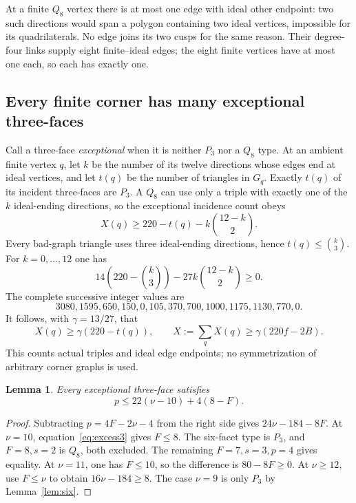 \documentclass[11pt]{article}
\newtheorem{lemma}[theorem]{Lemma}
\newcommand{\Pthree}{P_3}
\newcommand{\Qeight}{Q_8}
\begin{document}
At a finite $\Qeight$ vertex there is at most one edge with
ideal other endpoint: two such directions would span a polygon
containing two ideal vertices, impossible for its quadrilaterals.
No edge joins its two cusps for the same reason. Their degree-four
links supply eight finite--ideal edges; the eight finite vertices
have at most one each, so each has exactly one.

\subsection{Every finite corner has many exceptional three-faces}
Call a three-face \emph{exceptional} when it is neither $\Pthree$
nor a $\Qeight$ type. At an ambient finite vertex $q$, let $k$
be the number of its twelve directions whose edges end at ideal
vertices, and let $t(q)$ be the number of triangles in $G_q$.
Exactly $t(q)$ of its incident three-faces are $\Pthree$.
A $\Qeight$ can use only a triple with exactly one of the $k$
ideal-ending directions, so the exceptional incidence count obeys
\[
 X(q)\ge220-t(q)-k\binom{12-k}{2}.
\]
Every bad-graph triangle uses three ideal-ending directions, hence
$t(q)\le\binom k3$. For $k=0,\ldots,12$ one has
\[
 14\left(220-\binom k3\right)-27k\binom{12-k}{2}\ge0.
\]
The complete successive integer values are
\[
 3080,1595,650,150,0,105,370,700,1000,1175,1130,770,0.
\]
It follows, with $\gamma=13/27$, that
\begin{equation}\label{eq:Xlower}
 X(q)\ge\gamma(220-t(q)),\qquad
 X:=\sum_q X(q)\ge\gamma(220f-2B).
\end{equation}
This counts actual triples and ideal edge endpoints; no
symmetrization of arbitrary corner graphs is used.

\begin{lemma}\label{lem:budget}
Every exceptional three-face satisfies
\begin{equation}\label{eq:budget}
 p\le22(\nu-10)+4(8-F).
\end{equation}
\end{lemma}
\begin{proof}
Subtracting $p=4F-2\nu-4$ from the right side gives
$24\nu-184-8F$. At $\nu=10$, equation~\eqref{eq:excess3}
gives $F\le8$. The six-facet type is $\Pthree$, and $F=8,s=2$
is $\Qeight$, both excluded. The remaining $F=7,s=3,p=4$
gives equality. At $\nu=11$, one has $F\le10$, so the
difference is $80-8F\ge0$. At $\nu\ge12$, use $F\le\nu$
to obtain $16\nu-184\ge8$. The case $\nu=9$ is only
$\Pthree$ by Lemma~\ref{lem:six}.
\end{proof}
\end{document}
